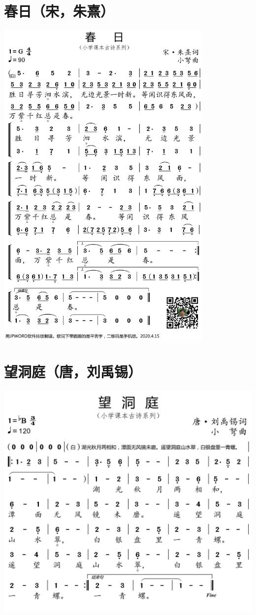 \documentclass[cn,pad,twocol]{elegantbook}
\begin{document}
\section{春日（宋，朱熹）}      \includegraphics[width=0.8\textwidth]{dongxiao/20200627-古诗-春日.jpg}   
\section{望洞庭（唐，刘禹锡）}  \includegraphics[width=\textwidth]{dongxiao/20200627-古诗-望洞庭.jpg}   
\end{document}
